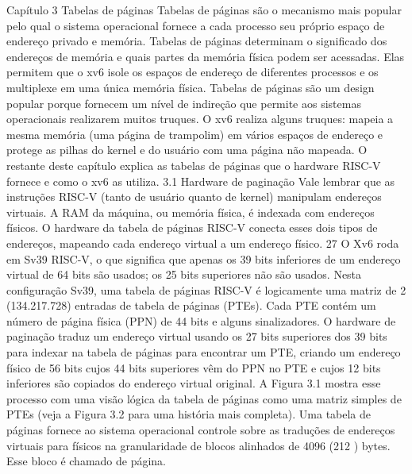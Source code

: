  Capítulo  3
 Tabelas  de  páginas
 Tabelas  de  páginas  são  o  mecanismo  mais  popular  pelo  qual  o  sistema  operacional  fornece  a  cada  processo  seu  próprio  
espaço  de  endereço  privado  e  memória.  Tabelas  de  páginas  determinam  o  significado  dos  endereços  de  memória  e  
quais  partes  da  memória  física  podem  ser  acessadas.  Elas  permitem  que  o  xv6  isole  os  espaços  de  endereço  de  diferentes  
processos  e  os  multiplexe  em  uma  única  memória  física.  Tabelas  de  páginas  são  um  design  popular  porque  fornecem  
um  nível  de  indireção  que  permite  aos  sistemas  operacionais  realizarem  muitos  truques.  O  xv6  realiza  alguns  truques:  
mapeia  a  mesma  memória  (uma  página  de  trampolim)  em  vários  espaços  de  endereço  e  protege  as  pilhas  do  kernel  e  do  
usuário  com  uma  página  não  mapeada.  O  restante  deste  capítulo  explica  as  tabelas  de  páginas  que  o  hardware  RISC-V  
fornece  e  como  o  xv6  as  utiliza.
 3.1  Hardware  de  paginação
 Vale  lembrar  que  as  instruções  RISC-V  (tanto  de  usuário  quanto  de  kernel)  manipulam  endereços  virtuais.  A  RAM  da  
máquina,  ou  memória  física,  é  indexada  com  endereços  físicos.  O  hardware  da  tabela  de  páginas  RISC-V  conecta  esses  
dois  tipos  de  endereços,  mapeando  cada  endereço  virtual  a  um  endereço  físico.
 27
 O  Xv6  roda  em  Sv39  RISC-V,  o  que  significa  que  apenas  os  39  bits  inferiores  de  um  endereço  virtual  de  64  bits  são  
usados;  os  25  bits  superiores  não  são  usados.  Nesta  configuração  Sv39,  uma  tabela  de  páginas  RISC-V  é  logicamente  
uma  matriz  de  2  (134.217.728)  entradas  de  tabela  de  páginas  (PTEs).  Cada  PTE  contém  um  número  de  página  física  
(PPN)  de  44  bits  e  alguns  sinalizadores.  O  hardware  de  paginação  traduz  um  endereço  virtual  usando  os  27  bits  superiores  
dos  39  bits  para  indexar  na  tabela  de  páginas  para  encontrar  um  PTE,  criando  um  endereço  físico  de  56  bits  cujos  44  bits  
superiores  vêm  do  PPN  no  PTE  e  cujos  12  bits  inferiores  são  copiados  do  endereço  virtual  original.  A  Figura  3.1  mostra  
esse  processo  com  uma  visão  lógica  da  tabela  de  páginas  como  uma  matriz  simples  de  PTEs  (veja  a  Figura  3.2  para  uma  
história  mais  completa).  Uma  tabela  de  páginas  fornece  ao  sistema  operacional  controle  sobre  as  traduções  de  endereços  
virtuais  para  físicos  na  granularidade  de  blocos  alinhados  de  4096  (212 )  bytes.  Esse  bloco  é  chamado  de  página.
